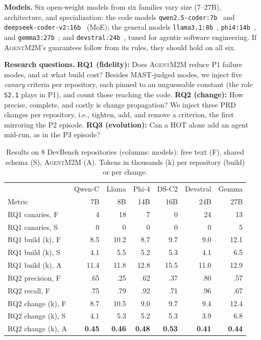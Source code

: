 \documentclass[10pt,conference]{IEEEtran}
\theoremstyle{definition}
\newcommand{\tool}{\textsc{AgentM2M}}
\newcommand{\code}[1]{\texttt{#1}}
\begin{document}
\smallskip\noindent\textbf{Models.} Six open-weight models from six
families vary size (7--27B), architecture, and specialization: the code
models \texttt{qwen2.5-coder:7b}~\cite{hui2024qwen25coder} and
\texttt{deepseek-coder-v2:16b}~\cite{deepseek2024coderv2} (MoE); the
general models \texttt{llama3.1:8b}~\cite{grattafiori2024llama3},
\texttt{phi4:14b}~\cite{abdin2024phi4}, and \texttt{gemma3:27b}~\cite{team2025gemma3};
and \texttt{devstral:24b}~\cite{rastogi2025devstral}, tuned for agentic
software engineering. If \tool{}'s guarantees follow from its rules, they
should hold on all six. %

\smallskip\noindent\textbf{Research questions.}
\textbf{RQ1 (fidelity):} Does \tool{} reduce P1 failure modes, and at what
build cost? Besides MAST-judged modes, we inject five \emph{canary}
criteria per repository, each pinned to an unguessable constant (the role
\code{S2.1} plays in P1), and count those reaching the code.
\textbf{RQ2 (change):} How precise, complete, and costly is change
propagation? We inject three PRD changes per repository, i.e., tighten, add, and
remove a criterion, the first mirroring the P2 episode.
\textbf{RQ3 (evolution):} Can a HOT alone add an agent mid-run, as in the
P3 episode?

\begin{table}[t]
\centering
\caption{Results on 8 DevBench repositories (columns: models): free text (F), shared schema (S), \tool{} (A).
Tokens in thousands (k) per repository (build) or per change.}
\label{tab:results}
\footnotesize
\setlength{\tabcolsep}{2.4pt}
\begin{tabular}{@{}l rrrrrr@{}}
\toprule
& Qwen-C & Llama & Phi-4 & DS-C2 & Devstral & Gemma \\
Metric & 7B & 8B & 14B & 16B & 24B & 27B \\
\midrule
RQ1 canaries, F & 4 & 18 & 7 & 0 & 24 & 13 \\
RQ1 canaries, S & 0 & 0 & 0 & 0 & 0 & 5 \\
RQ1 build (k), F & 8.5 & 10.2 & 8.7 & 9.7 & 9.0 & 12.1 \\
RQ1 build (k), S & 4.1 & 5.5 & 5.2 & 5.3 & 4.1 & 6.5 \\
RQ1 build (k), A & 11.4 & 11.8 & 12.8 & 15.5 & 11.0 & 12.9 \\
\midrule
RQ2 precision, F & .65 & .25 & .62 & .37 & .80 & .57 \\
RQ2 recall, F & .75 & .79 & .92 & .71 & .96 & .67 \\
RQ2 change (k), F & 8.7 & 10.5 & 9.0 & 9.7 & 9.4 & 12.4 \\
RQ2 change (k), S & 4.1 & 5.3 & 5.2 & 5.3 & 3.9 & 6.8 \\
RQ2 change (k), A & \textbf{0.45} & \textbf{0.46} & \textbf{0.48} & \textbf{0.53} & \textbf{0.41} & \textbf{0.44} \\
\bottomrule
\end{tabular}
\end{table}
\end{document}
